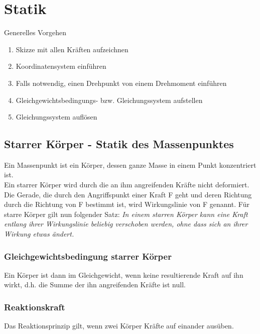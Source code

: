 \section{Statik}

Generelles Vorgehen
\begin{enumerate}
	\item  Skizze mit allen Kräften aufzeichnen
	\item Koordinatensystem einführen
	\item Falls notwendig, einen Drehpunkt von einem Drehmoment einführen 
	\item Gleichgewichtsbedingungs- bzw. Gleichungssystem aufstellen
	\item Gleichungssystem auflösen
\end{enumerate}

\subsection{Starrer Körper - Statik des Massenpunktes}
Ein Massenpunkt ist ein Körper, dessen ganze Masse in 
einem Punkt konzentriert ist. \\
Ein starrer Körper wird durch die an ihm angreifenden 
Kräfte nicht deformiert. Die Gerade, die durch den Angriffspunkt einer Kraft F geht und 
deren Richtung durch die Richtung von F bestimmt ist, wird 
Wirkungslinie von  F genannt. Für starre Körper gilt nun 
folgender Satz:
\textit{In einem starren Körper kann eine Kraft entlang ihrer 
Wirkungslinie beliebig verschoben werden, ohne dass sich 
an ihrer Wirkung etwas ändert.} 

\subsubsection{Gleichgewichtsbedingung starrer Körper}
Ein Körper ist dann im Gleichgewicht, wenn keine resultierende Kraft auf ihn wirkt, d.h. die Summe der ihn angreifenden Kräfte ist null. \\


\subsubsection{Reaktionskraft}
Das Reaktionsprinzip gilt, wenn zwei Körper Kräfte auf einander ausüben.

